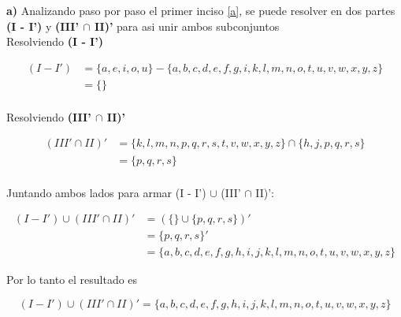 \newpage


\textbf{a)} Analizando paso por paso el primer inciso \ref{a}, se puede resolver en dos partes \textbf{(I - I')} y \textbf{(III' $\cap$ II)'} para asi unir ambos subconjuntos \\

Resolviendo \textbf{(I - I')}

\begin{align*}
(I - I')  &= \{a, e, i, o, u\} - \{ a, b, c, d, e, f, g, i, k, l, m, n, o, t, u, v, w, x, y, z \}  \\
  &= \{\} \\
\end{align*}

Resolviendo \textbf{(III' $\cap$ II)'}

\begin{align*}
(III' \cap II)'  &= \{ k, l, m, n, p, q, r, s, t, v, w, x, y, z \} \cap \{ h, j, p, q, r, s  \}  \\
  &= \{p, q, r, s \} \\
\end{align*}

Juntando ambos lados para armar (I - I') $\cup$ (III' $\cap$ II)':

\begin{align*}
(I - I') \cup (III' \cap II)' &= ( \{ \} \cup \{p, q, r, s \} )' \\
  &= \{p, q, r, s \}' \\
  &= \{ a, b, c, d, e, f, g, h, i, j, k, l, m, n, o, t, u, v, w, x, y, z \} 
\end{align*}

Por lo tanto el resultado es

\begin{equation*}
    \boxed{(I - I') \cup (III' \cap II)' = \{ a, b, c, d, e, f, g, h, i, j, k, l, m, n, o, t, u, v, w, x, y, z \} }
\end{equation*}